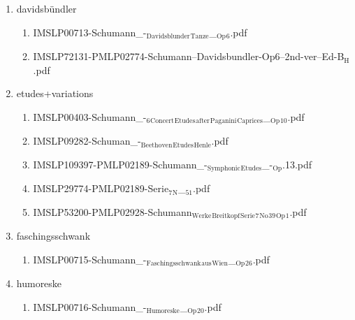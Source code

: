 \documentclass[11pt]{article}
\begin{document}
\begin{enumerate}
\begin{enumerate}
\item davidsbündler
\label{sec-1-1-1-1-44-61-5-2}
\begin{enumerate}
\item IMSLP00713-Schumann\_-$_{\text{Davidsblunder}}$$_{\text{Tanze}}$\_$_{\text{Op}}$$_{\text{6}}$.pdf
\label{sec-1-1-1-1-44-61-5-2-1}

\item IMSLP72131-PMLP02774-Schumann--Davidsbundler-Op6--2nd-ver--Ed-B$_{\text{H}}$.pdf
\label{sec-1-1-1-1-44-61-5-2-2}
\end{enumerate}

\item etudes+variations
\label{sec-1-1-1-1-44-61-5-3}
\begin{enumerate}
\item IMSLP00403-Schumann\_-$_{\text{6}}$$_{\text{Concert}}$$_{\text{Etudes}}$$_{\text{after}}$$_{\text{Paganini}}$$_{\text{Caprices}}$\_$_{\text{Op}}$$_{\text{10}}$.pdf
\label{sec-1-1-1-1-44-61-5-3-1}

\item IMSLP09282-Schuman\_-$_{\text{Beethoven}}$$_{\text{Etudes}}$$_{\text{Henle}}$.pdf
\label{sec-1-1-1-1-44-61-5-3-2}

\item IMSLP109397-PMLP02189-Schumann\_-$_{\text{Symphonic}}$$_{\text{Etudes}}$\_-$_{\text{Op}}$.13.pdf
\label{sec-1-1-1-1-44-61-5-3-3}

\item IMSLP29774-PMLP02189-Serie$_{\text{7}}$$_{\text{N}}$\_$_{\text{51}}$.pdf
\label{sec-1-1-1-1-44-61-5-3-4}

\item IMSLP53200-PMLP02928-Schumann$_{\text{Werke}}$$_{\text{Breitkopf}}$$_{\text{Serie}}$$_{\text{7}}$$_{\text{No}}$$_{\text{39}}$$_{\text{Op}}$$_{\text{1}}$.pdf
\label{sec-1-1-1-1-44-61-5-3-5}
\end{enumerate}

\item faschingsschwank
\label{sec-1-1-1-1-44-61-5-4}
\begin{enumerate}
\item IMSLP00715-Schumann\_-$_{\text{Faschingsschwank}}$$_{\text{aus}}$$_{\text{Wien}}$\_$_{\text{Op}}$$_{\text{26}}$.pdf
\label{sec-1-1-1-1-44-61-5-4-1}
\end{enumerate}

\item humoreske
\label{sec-1-1-1-1-44-61-5-5}
\begin{enumerate}
\item IMSLP00716-Schumann\_-$_{\text{Humoreske}}$\_$_{\text{Op}}$$_{\text{20}}$.pdf
\label{sec-1-1-1-1-44-61-5-5-1}
\end{enumerate}


\end{enumerate}
\end{enumerate}
\end{document}
